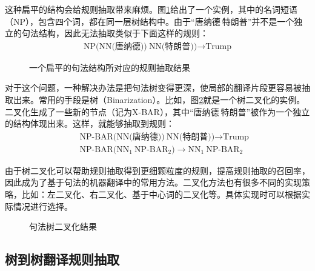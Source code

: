 \parinterval 这种扁平的结构会给规则抽取带来麻烦。图\ref{fig:4-59}给出了一个实例，其中的名词短语（NP），包含四个词，都在同一层树结构中。由于``唐纳德$\ $特朗普''并不是一个独立的句法结构，因此无法抽取类似于下面这样的规则：
\begin{eqnarray}
\textrm{NP(NN(唐纳德))}\ \textrm{NN(特朗普))} \rightarrow \textrm{Trump} \nonumber
\end{eqnarray}

\begin{figure}[htp]
\centering

\caption{一个扁平的句法结构所对应的规则抽取结果}
\label{fig:4-59}
\end{figure}

\parinterval 对于这个问题，一种解决办法是把句法树变得更深，使局部的翻译片段更容易被抽取出来。常用的手段是树{\small{}}（Binarization）。比如，图\ref{fig:4-60}就是一个树二叉化的实例。二叉化生成了一些新的节点（记为X-BAR），其中``唐纳德$\ $特朗普''被作为一个独立的结构体现出来。这样，就能够抽取到规则：
\begin{eqnarray}
&& \textrm{NP-BAR(NN(唐纳德))}\ \textrm{NN(特朗普))} \rightarrow \textrm{Trump} \nonumber \\
&& \textrm{NP-BAR(}\textrm{NN}_1\ \textrm{NP-}\textrm{BAR}_2) \rightarrow \textrm{NN}_1\ \textrm{NP-}\textrm{BAR}_2 \nonumber
\end{eqnarray}

\parinterval 由于树二叉化可以帮助规则抽取得到更细颗粒度的规则，提高规则抽取的召回率，因此成为了基于句法的机器翻译中的常用方法。二叉化方法也有很多不同的实现策略，比如：左二叉化\cite{DBLP:conf/naacl/ZhangHGK06}、右二叉化\cite{Tong2009Better}、基于中心词的二叉化\cite{DBLP:conf/acl/KleinM03,charniak2006multilevel}等。具体实现时可以根据实际情况进行选择。

\begin{figure}[htp]
\centering

\caption{句法树二叉化结果}
\label{fig:4-60}
\end{figure}


\subsection{树到树翻译规则抽取}

